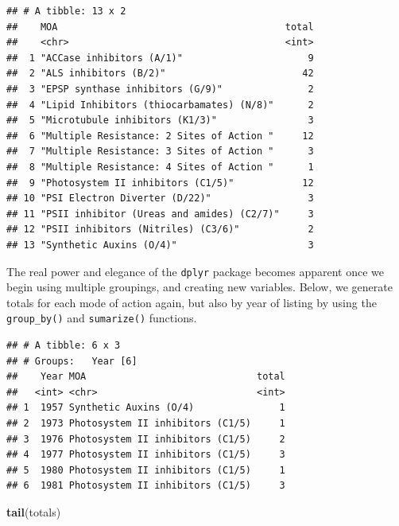 \documentclass[letterpaper,]{book}
\newenvironment{Shaded}{\begin{snugshade}}{\end{snugshade}}
\newcommand{\DataTypeTok}[1]{\textcolor[rgb]{0.13,0.29,0.53}{#1}}
\newcommand{\KeywordTok}[1]{\textcolor[rgb]{0.13,0.29,0.53}{\textbf{#1}}}
\newcommand{\NormalTok}[1]{#1}
\newcommand{\OperatorTok}[1]{\textcolor[rgb]{0.81,0.36,0.00}{\textbf{#1}}}
\newcommand{\StringTok}[1]{\textcolor[rgb]{0.31,0.60,0.02}{#1}}
\begin{document}
\begin{verbatim}
## # A tibble: 13 x 2
##    MOA                                        total
##    <chr>                                      <int>
##  1 "ACCase inhibitors (A/1)"                      9
##  2 "ALS inhibitors (B/2)"                        42
##  3 "EPSP synthase inhibitors (G/9)"               2
##  4 "Lipid Inhibitors (thiocarbamates) (N/8)"      2
##  5 "Microtubule inhibitors (K1/3)"                3
##  6 "Multiple Resistance: 2 Sites of Action "     12
##  7 "Multiple Resistance: 3 Sites of Action "      3
##  8 "Multiple Resistance: 4 Sites of Action "      1
##  9 "Photosystem II inhibitors (C1/5)"            12
## 10 "PSI Electron Diverter (D/22)"                 3
## 11 "PSII inhibitor (Ureas and amides) (C2/7)"     3
## 12 "PSII inhibitors (Nitriles) (C3/6)"            2
## 13 "Synthetic Auxins (O/4)"                       3
\end{verbatim}

The real power and elegance of the \texttt{dplyr} package becomes apparent once we begin using multiple groupings, and creating new variables. Below, we generate totals for each mode of action again, but also by year of listing by using the \texttt{group\_by()} and \texttt{sumarize()} functions.

\begin{Shaded}
\end{Shaded}

\begin{verbatim}
## # A tibble: 6 x 3
## # Groups:   Year [6]
##    Year MOA                              total
##   <int> <chr>                            <int>
## 1  1957 Synthetic Auxins (O/4)               1
## 2  1973 Photosystem II inhibitors (C1/5)     1
## 3  1976 Photosystem II inhibitors (C1/5)     2
## 4  1977 Photosystem II inhibitors (C1/5)     3
## 5  1980 Photosystem II inhibitors (C1/5)     1
## 6  1981 Photosystem II inhibitors (C1/5)     3
\end{verbatim}

\begin{Shaded}
\begin{Highlighting}[]
\KeywordTok{tail}\NormalTok{(totals)}
\end{Highlighting}
\end{Shaded}
\end{document}

